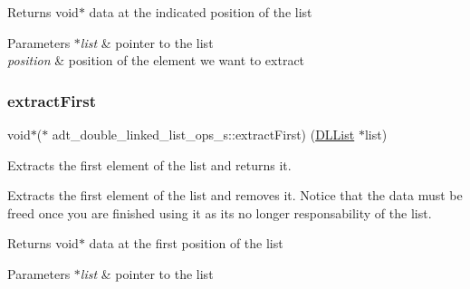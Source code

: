 \begin{DoxyReturn}{Returns}
void$\ast$ data at the indicated position of the list 
\end{DoxyReturn}

\begin{DoxyParams}{Parameters}
{\em $\ast$list} & pointer to the list \\
\hline
{\em position} & position of the element we want to extract \\
\hline
\end{DoxyParams}
\mbox{\label{structadt__double__linked__list__ops__s_a4ad95f5f73220766b7784b86fe950f7b}} 
\subsubsection{\texorpdfstring{extract\+First}{extractFirst}}
{\footnotesize\ttfamily void$\ast$($\ast$ adt\+\_\+double\+\_\+linked\+\_\+list\+\_\+ops\+\_\+s\+::extract\+First) (\hyperlink{structadt__double__linked__list__s}{D\+L\+List} $\ast$list)}



Extracts the first element of the list and returns it. 

Extracts the first element of the list and removes it. Notice that the data must be freed once you are finished using it as it\textquotesingle{}s no longer responsability of the list.

\begin{DoxyReturn}{Returns}
void$\ast$ data at the first position of the list 
\end{DoxyReturn}

\begin{DoxyParams}{Parameters}
{\em $\ast$list} & pointer to the list \\
\hline
\end{DoxyParams}
\mbox{\label{structadt__double__linked__list__ops__s_a738730a58de549e634b8a6ccec3fdf4c}} 
